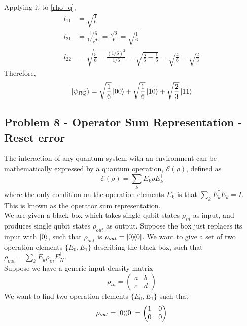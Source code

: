 Applying it to \eqref{rho_q}, 
\begin{align}
    l_{11} &= \sqrt{\frac{1}{6}} \\
    l_{21} &= \frac{1/6}{1/\sqrt{6}} = \frac{\sqrt{6}}{6} = \sqrt{\frac{1}{6}} \\
    l_{22} &= \sqrt{\frac{5}{6} = \frac{(1/6)^2}{1/6}} = \sqrt{\frac{5}{6} - \frac{1}{6}} = \sqrt{\frac{4}{6}} = \sqrt{\frac{2}{3}}
\end{align}
Therefore, 
\begin{align}
    \ket{\psi_{RQ}} = \sqrt{\frac{1}{6}}\ket{00} + \sqrt{\frac{1}{6}}\ket{10} + \sqrt{\frac{2}{3}} \ket{11}
\end{align}



\newpage
\subsection{Problem 8 - Operator Sum Representation - Reset error}
The interaction of any quantum system with an environment can be mathematically expressed by a quantum operation, $\mathcal{E}(\rho)$, defined as 
\begin{equation}
    \mathcal{E}(\rho) = \sum_k E_k \rho E_k^\dagger
\end{equation}
where the only condition on the operation elements $E_k$ is that $\sum_k E_k^\dagger E_k = I$. This is known as the operator sum representation. \\
We are given a black box which takes single qubit states $\rho_{in}$ as input, and produces single qubit states $\rho_{out}$ as output. Suppose the box just replaces its input with $\ket{0}$, such that $\rho_{out}$ is $\rho_{out} = \ketbra{0}$. We want to give a set of two operation elements $\{E_0, E_1\}$ describing the black box, such that $\rho_{out} = \sum_k E_k \rho_{in}E_K^\dagger$. \\
Suppose we have a generic input density matrix 
\begin{equation}
    \rho_{in} = \begin{pmatrix}a & b \\ c & d\end{pmatrix}
\end{equation}
We want to find two operation elements $\{E_0,E_1\}$ such that 
\begin{equation}
    \rho_{out} = \ketbra{0} = \begin{pmatrix}1 & 0 \\ 0 & 0\end{pmatrix}
\end{equation}
